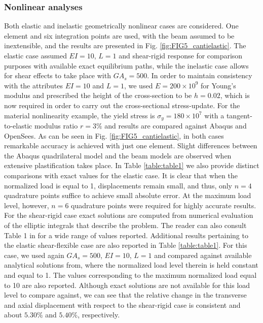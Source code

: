 \subsubsection{Nonlinear analyses}
Both elastic and inelastic geometrically nonlinear cases are
considered. One
element and six integration points are used, with the beam assumed to be
inextensible, and the results are presented in Fig. 
\ref{fig:FIG5_cantielastic}. 
The elastic
case assumed $EI=10$, $L=1$ and shear-rigid response for comparison purposes 
with available exact equilibrium paths\cite{bisshopp}, while the inelastic
case allows for shear effects to take place with $GA_s=500$. In order to
maintain consistency with the attributes $EI=10$ and $L=1$, we used $E=200\times
10^9$ for Young's modulus and prescribed the height of the cross-section to be
$h=0.02$, which is now required in order to carry out the cross-sectional
stress-update.
For the material nonlinearity example, the yield stress is 
$\sigma_y=180\times10^7$ with a tangent-to-elastic modulus
ratio $r=3\%$ and results are compared against Abaqus and OpenSees. 
As can be seen in
Fig. \ref{fig:FIG5_cantielastic}, in both cases remarkable accuracy is 
achieved
with just one element. Slight differences between the Abaqus quadrilateral 
model and
the beam models are observed when extensive plastification takes place. In 
Table \ref{table:table1} we also provide distinct comparisons with exact
values for the elastic case. It is clear
that when the normalized load is equal to 1, displacements remain small, and
thus, only $n=4$ quadrature points suffice to achieve small absolute error. At
the maximum load level, however, $n=6$ quadrature points 
were required for highly accurate results. 
For the shear-rigid case exact solutions are computed from numerical evaluation 
of the
elliptic integrals that describe the problem. The reader can also consult Table
1 in \cite{Mattiasson} for a wide range of values reported. Additional results
pertaining to the elastic shear-flexible case are also reported in Table
\ref{table:table1}. For this case, we used again $GA_s=500$, $EI=10$, $L=1$ and 
compared against available 
analytical solutions from\cite{Batista2}, where the normalized load
level therein is held constant and equal to 1. The values corresponding to the
maximum normalized load equal to 10 are also reported. Although exact solutions
are not available for this load level to compare against, we can see that the 
relative
change in the transverse and axial displacement with respect to the shear-rigid
case is consistent and about $5.30\%$ and $5.40\%$,
respectively.

